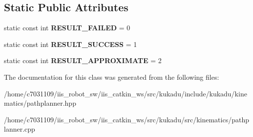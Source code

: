 \subsection*{Static Public Attributes}
\begin{DoxyCompactItemize}
\item 
\hypertarget{classkukadu_1_1PathPlanner_a7baeae45bb2804b8142840ee96c7bcde}{static const int {\bfseries R\-E\-S\-U\-L\-T\-\_\-\-F\-A\-I\-L\-E\-D} = 0}\label{classkukadu_1_1PathPlanner_a7baeae45bb2804b8142840ee96c7bcde}

\item 
\hypertarget{classkukadu_1_1PathPlanner_a0e4f5875792d7d4c5e91f53d7d1d9f51}{static const int {\bfseries R\-E\-S\-U\-L\-T\-\_\-\-S\-U\-C\-C\-E\-S\-S} = 1}\label{classkukadu_1_1PathPlanner_a0e4f5875792d7d4c5e91f53d7d1d9f51}

\item 
\hypertarget{classkukadu_1_1PathPlanner_a41ed61ccf2715e4e838c12aaa7311e54}{static const int {\bfseries R\-E\-S\-U\-L\-T\-\_\-\-A\-P\-P\-R\-O\-X\-I\-M\-A\-T\-E} = 2}\label{classkukadu_1_1PathPlanner_a41ed61ccf2715e4e838c12aaa7311e54}

\end{DoxyCompactItemize}


The documentation for this class was generated from the following files\-:\begin{DoxyCompactItemize}
\item 
/home/c7031109/iis\-\_\-robot\-\_\-sw/iis\-\_\-catkin\-\_\-ws/src/kukadu/include/kukadu/kinematics/pathplanner.\-hpp\item 
/home/c7031109/iis\-\_\-robot\-\_\-sw/iis\-\_\-catkin\-\_\-ws/src/kukadu/src/kinematics/pathplanner.\-cpp\end{DoxyCompactItemize}
